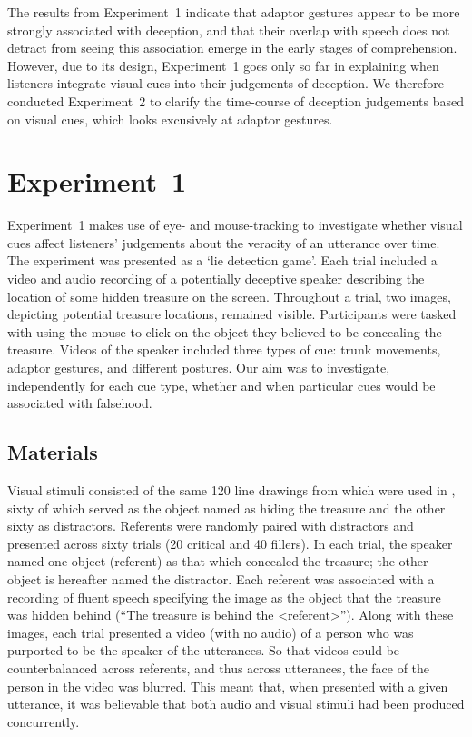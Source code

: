 \documentclass[a4paper,man,natbib]{apa6}
\begin{document}
The results from Experiment~1 indicate that adaptor gestures appear to be more strongly associated with deception, and that their overlap with speech does not detract from seeing this association emerge in the early stages of comprehension.
However, due to its design, Experiment~1 goes only so far in explaining when listeners integrate visual cues into their judgements of deception.
We therefore conducted Experiment~2 to clarify the time-course of deception judgements based on visual cues, which looks excusively at adaptor gestures.


\section{Experiment~1}
Experiment~1 makes use of eye- and mouse-tracking to investigate whether visual cues affect listeners' judgements about the veracity of an utterance over time. 
The experiment was presented as a `lie detection game'.
Each trial included a video and audio recording of a potentially deceptive speaker describing the location of some hidden treasure on the screen.
Throughout a trial, two images, depicting potential treasure locations, remained visible. 
Participants were tasked with using the mouse to click on the object they believed to be concealing the treasure.
Videos of the speaker included three types of cue: trunk movements, adaptor gestures, and different postures.
Our aim was to investigate, independently for each cue type, whether and when particular cues would be associated with falsehood.


\subsection{Materials}
Visual stimuli consisted of the same 120 line drawings from \citet{Snodgrass1980} which were used in \citet{Loy2017}, sixty of which served as the object named as hiding the treasure and the other sixty as distractors.
Referents were randomly paired with distractors and presented across sixty trials (20 critical and 40 fillers). 
In each trial, the speaker named one object (referent) as that which concealed the treasure; the other object is hereafter named the distractor.
Each referent was associated with a recording of fluent speech specifying the image as the object that the treasure was hidden behind (``The treasure is behind the <referent>'').
Along with these images, each trial presented a video (with no audio) of a person who was purported to be the speaker of the utterances. 
So that videos could be counterbalanced across referents, and thus across utterances, the face of the person in the video was blurred. 
This meant that, when presented with a given utterance, it was believable that both audio and visual stimuli had been produced concurrently. 
\end{document}
